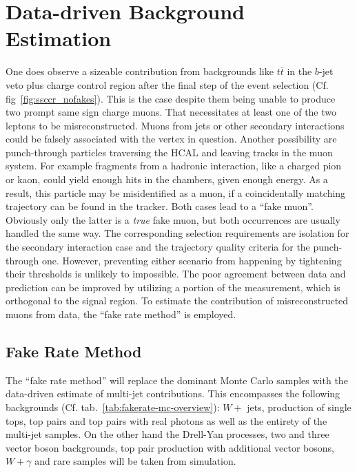 \chapter{Data-driven Background Estimation}
\label{cha:datadrivenbg}

One does observe a sizeable contribution from backgrounds like $t\bar{t}$ in the $b$-jet veto plus charge control region after the final step of the event selection (Cf. fig~\ref{fig:ssccr_nofakes}). This is the case despite them being unable to produce two prompt same sign charge muons. That necessitates at least one of the two leptons to be misreconstructed. Muons from jets or other secondary interactions could be falsely associated with the vertex in question. Another possibility are punch-through particles traversing the HCAL and leaving tracks in the muon system. For example fragments from a hadronic interaction, like a charged pion or kaon, could yield enough hits in the chambers, given enough energy. As a result, this particle may be misidentified as a muon, if a coincidentally matching trajectory can be found in the tracker. Both cases lead to a ``fake muon''. Obviously only the latter is a \textit{true} fake muon, but both occurrences are usually handled the same way. The corresponding selection requirements are isolation for the secondary interaction case and the trajectory quality criteria for the punch-through one. However, preventing either scenario from happening by tightening their thresholds is unlikely to impossible. The poor agreement between data and prediction can be improved by utilizing a portion of the measurement, which is orthogonal to the signal region. To estimate the contribution of misreconstructed muons from data, the ``fake rate method'' is employed.


\section{Fake Rate Method}
\label{sec:fakerate}

The ``fake rate method'' will replace the dominant Monte Carlo samples with the data-driven estimate of multi-jet contributions. This encompasses the following backgrounds (Cf. tab.~\ref{tab:fakerate-mc-overview}): $W +$ jets, production of single tops, top pairs and top pairs with real photons as well as the entirety of the multi-jet samples. On the other hand the Drell-Yan processes, two and three vector boson backgrounds, top pair production with additional vector bosons, $W + \gamma$ and rare samples will be taken from simulation.

